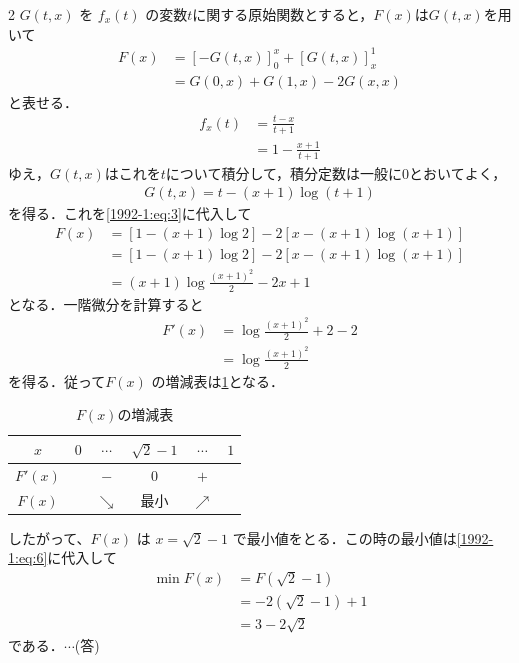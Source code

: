 \documentclass[../../main.tex]{subfiles}
\begin{document}
\begin{multicols}{2}
  $G(t,x)$ を $f_{x}(t)$ の変数$t$に関する原始関数とすると，$F(x)$は$G(t,x)$を用いて
  \begin{align}
    F(x)
     & = [-G(t,x)]_{0}^{x} + [G(t,x)]_{x}^{1} \nonumber \\
     & = G(0,x) + G(1,x) - 2G(x,x) \label{1992-1:eq:3}
  \end{align}
  と表せる．
  \begin{align*}
    f_{x}(t)
     & = \frac{t-x}{t+1}     \\
     & = 1 - \frac{x+1}{t+1}
  \end{align*}
  ゆえ，$G(t,x)$はこれを$t$について積分して，積分定数は一般に$0$とおいてよく，
  \begin{align*}
    G(t,x) = t - (x+1)\log(t+1)
  \end{align*}
  を得る．これを\cref{1992-1:eq:3}に代入して
  \begin{align}
    F(x)
     & = \left[1-(x+1)\log 2\right] -2 \left[x-(x+1)\log(x+1)\right] \nonumber \\
     & = \left[1-(x+1)\log 2\right] -2 \left[x-(x+1)\log(x+1)\right] \nonumber \\
     & = (x+1) \log\frac{\left(x+1\right)^2}{2} -2x + 1 \label{1992-1:eq:6}
  \end{align}
  となる．一階微分を計算すると
  \begin{align*}
    F'(x)
     & = \log\frac{\left(x+1\right)^2}{2} + 2 -2 \\
     & = \log\frac{\left(x+1\right)^2}{2}
  \end{align*}
  を得る．従って$F(x)$ の増減表は\cref{1992-1:table:1}となる．
  \begin{table}[H]
    \centering
    \caption{$F(x)$の増減表}
    \label{1992-1:table:1}
    \begin{tabular}{|c||c|c|c|c|c|}
      \hline
      $x$     & $0$ & $\cdots$   & $\sqrt{2}-1$ & $\cdots$   & $1$ \\
      \hline
      $F'(x)$ &     & $-$        & $0$          & $+$        &     \\
      \hline
      $F(x)$  &     & $\searrow$ & 最小           & $\nearrow$ &     \\
      \hline
    \end{tabular}
  \end{table}

  したがって、$F(x)$ は $x=\sqrt{2}-1$ で最小値をとる．この時の最小値は\cref{1992-1:eq:6}に代入して
  \begin{align*}
    \min F(x)
     & = F(\sqrt{2}-1)      \\
     & = -2(\sqrt{2}-1) + 1 \\
     & = 3 - 2\sqrt{2}
  \end{align*}
  である．$\cdots$(答)
  \vspace{10pt}


\end{multicols}
\end{document}
